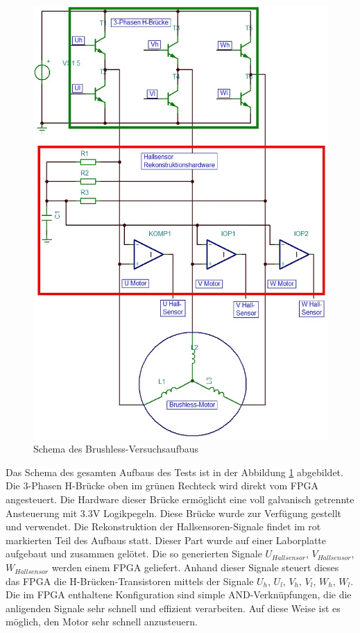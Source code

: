 \begin{figure}
	\includegraphics[scale=0.37]{Funktionstests/Bilder/MotoransteuerungSchema.jpg}
	\centering
	\caption{Schema des Brushless-Versuchsaufbaus} 
\label{abb:MotoransteuerungSchema}
\end{figure}
Das Schema des gesamten Aufbaus des Tests ist in der Abbildung \ref{abb:MotoransteuerungSchema} abgebildet. Die 3-Phasen H-Brücke oben im grünen Rechteck wird direkt vom FPGA angesteuert. Die Hardware dieser Brücke ermöglicht eine voll galvanisch getrennte Ansteuerung mit 3.3V Logikpegeln. Diese Brücke wurde zur Verfügung gestellt und verwendet. Die Rekonstruktion der Hallsensoren-Signale findet im rot markierten Teil des Aufbaus statt. Dieser Part wurde auf einer Laborplatte aufgebaut und zusammen gelötet. Die so generierten Signale $U_{Hallsensor}$, $V_{Hallsensor}$, $W_{Hallsensor}$ werden einem FPGA geliefert. Anhand dieser Signale steuert dieses das FPGA die H-Brücken-Transistoren mittels der Signale $U_h$, $U_l$, $V_h$, $V_l$, $W_h$, $W_l$. Die im FPGA enthaltene Konfiguration sind simple AND-Verknüpfungen, die die anligenden Signale sehr schnell und effizient verarbeiten. Auf diese Weise ist es möglich, den Motor sehr schnell anzusteuern.\\
